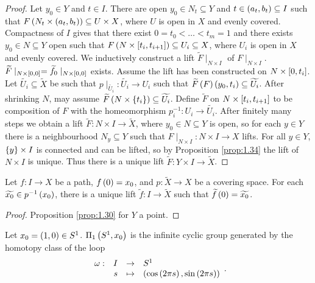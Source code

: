 \begin{proof}
Let $ y_0 \in Y $ and $ t \in I $. There are open $ y_0 \in N_t \subseteq Y $ and $ t \in \rb{a_t, b_t} \subseteq I $ such that $ F\rb{N_t \times \rb{a_t, b_t}} \subseteq U \times X $, where $ U $ is open in $ X $ and evenly covered. Compactness of $ I $ gives that there exist $ 0 = t_0 < \dots < t_m = 1 $ and there exists $ y_0 \in N \subseteq Y $ open such that $ F\rb{N \times \sb{t_i, t_{i + 1}}} \subseteq U_i \subseteq X $, where $ U_i $ is open in $ X $ and evenly covered. We inductively construct a lift $ \widetilde{F} \mid_{N \times I} $ of $ F \mid_{N \times I} $. $ \widetilde{F} \mid_{N \times \sb{0, 0}} = \widetilde{f_0} \mid_{N \times \sb{0, 0}} $ exists. Assume the lift has been constructed on $ N \times \sb{0, t_i} $. Let $ \widetilde{U_i} \subseteq \widetilde{X} $ be such that $ p \mid_{\widetilde{U_i}} : \widetilde{U_i} \to U_i $ such that $ \widetilde{F}\rb{F}\rb{y_0, t_i} \subseteq \widetilde{U_i} $. After shrinking $ N $, may assume $ \widetilde{F}\rb{N \times \cb{t_i}} \subseteq \widetilde{U_i} $. Define $ \widetilde{F} $ on $ N \times \sb{t_i, t_{i + 1}} $ to be composition of $ F $ with the homeomorphism $ p_i^{-1} : U_i \to \widetilde{U_i} $. After finitely many steps we obtain a lift $ \widetilde{F} : N \times I \to \widetilde{X} $, where $ y_0 \in N \subseteq Y $ is open, so for each $ y \in Y $ there is a neighbourhood $ N_y \subseteq Y $ such that $ F \mid_{N \times I} : N \times I \to X $ lifts. For all $ y \in Y $, $ \cb{y} \times I $ is connected and can be lifted, so by Proposition \ref{prop:1.34} the lift of $ N \times I $ is unique. Thus there is a unique lift $ \widetilde{F} : Y \times I \to \widetilde{X} $.
\end{proof}

\begin{corollary}
Let $ f : I \to X $ be a path, $ f\rb{0} = x_0 $, and $ p : \widetilde{X} \to X $ be a covering space. For each $ \widetilde{x_0} \in p^{-1}\rb{x_0} $, there is a unique lift $ \widetilde{f} : I \to \widetilde{X} $ such that $ \widetilde{f}\rb{0} = \widetilde{x_0} $.
\end{corollary}

\begin{proof}
Proposition \ref{prop:1.30} for $ Y $ a point.
\end{proof}

\begin{theorem}
\label{thm:1.7}
Let $ x_0 = \rb{1, 0} \in S^1 $. $ \Pi_1\rb{S^1, x_0} $ is the infinite cyclic group generated by the homotopy class of the loop
$$ \function[\omega]{I}{S^1}{s}{\rb{\cos\rb{2\pi s}, \sin\rb{2\pi s}}}. $$
\end{theorem}

